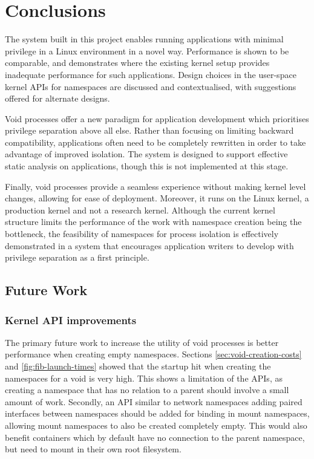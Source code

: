 \documentclass[12pt,a4paper,twoside]{report}
\begin{document}
\chapter{Conclusions}
\label{chap:conclusions}

The system built in this project enables running applications with minimal privilege in a Linux environment in a novel way. Performance is shown to be comparable, and demonstrates where the existing kernel setup provides inadequate performance for such applications. Design choices in the user-space kernel APIs for namespaces are discussed and contextualised, with suggestions offered for alternate designs.

Void processes offer a new paradigm for application development which prioritises privilege separation above all else. Rather than focusing on limiting backward compatibility, applications often need to be completely rewritten in order to take advantage of improved isolation. The system is designed to support effective static analysis on applications, though this is not implemented at this stage.

Finally, void processes provide a seamless experience without making kernel level changes, allowing for ease of deployment. Moreover, it runs on the Linux kernel, a production kernel and not a research kernel. Although the current kernel structure limits the performance of the work with namespace creation being the bottleneck, the feasibility of namespaces for process isolation is effectively demonstrated in a system that encourages application writers to develop with privilege separation as a first principle.

\section{Future Work}
\label{sec:future-work}

\subsection{Kernel API improvements}
\label{sec:future-work-kernel-api}

The primary future work to increase the utility of void processes is better performance when creating empty namespaces. Sections \ref{sec:void-creation-costs} and \ref{fig:fib-launch-times} showed that the startup hit when creating the namespaces for a void is very high. This shows a limitation of the APIs, as creating a namespace that has no relation to a parent should involve a small amount of work. Secondly, an API similar to network namespaces adding paired interfaces between namespaces should be added for binding in mount namespaces, allowing mount namespaces to also be created completely empty. This would also benefit containers which by default have no connection to the parent namespace, but need to mount in their own root filesystem.
\end{document}
